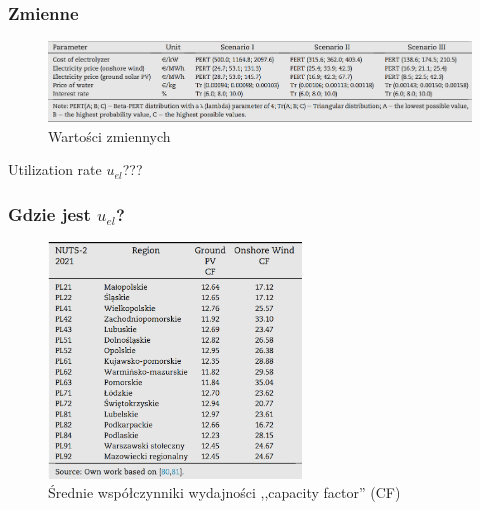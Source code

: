 \documentclass{beamer}
\begin{document}
\begin{frame}
	\frametitle{Zmienne}
	\begin{figure}
		\begin{center}
			\includegraphics[width=\textwidth]{mmc-variables.png}
		\end{center}
		\caption{Wartości zmiennych}
	\end{figure}
	\pause
	Utilization rate $u_{el}$???
\end{frame}

\begin{frame}
	\frametitle{Gdzie jest $u_{el}$?}
	\begin{figure}
		\begin{center}
			\includegraphics[width=0.6\textwidth]{mmc-cf-table.png}
		\end{center}
		\caption{Średnie współczynniki wydajności ,,capacity factor'' (CF)}
	\end{figure}
\end{frame}
\end{document}
